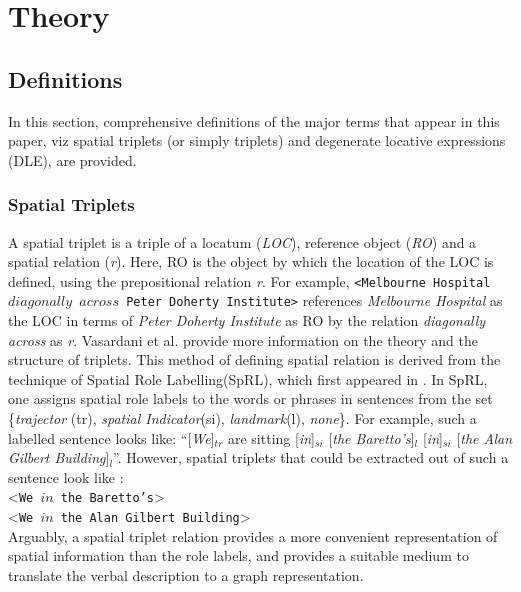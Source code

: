 \documentclass{acm_proc_article-sp}
\begin{document}
\section{Theory}
\subsection{Definitions}
In this section, comprehensive definitions of the major terms that appear in this paper, viz spatial triplets (or simply triplets) and degenerate locative expressions (DLE), are provided.
\subsubsection{Spatial Triplets}
A spatial triplet is a triple of a locatum (\textit{LOC}), reference object (\textit{RO}) and a spatial relation (\textit{r}). Here, RO is the object by which the location of the LOC is defined, using the prepositional relation \textit{r}. For example, \texttt{<Melbourne Hospital $diagonally$ $across$ Peter Doherty Institute>} references \textit{Melbourne Hospital} as the LOC in terms of \textit{Peter Doherty Institute} as RO by the relation \textit{diagonally across} as \textit{r}. Vasardani et al. \cite{maria:descriptions} provide more information on the theory and the structure of triplets. This method of defining spatial relation is derived from the technique of Spatial Role Labelling(SpRL), which first appeared in \cite{Kordjamshidi:labelling}. In SpRL, one assigns spatial role labels to the words or phrases in sentences from the set \{\textit{trajector} (tr), \textit{spatial Indicator}(si), \textit{landmark}(l), \textit{none}\}. For example, such a labelled sentence looks like:
``[\textit{We}]$_{tr}$ are sitting [\textit{in}]$_{si}$ [\textit{the Baretto's}]$_l$ [\textit{in}]$_{si}$ [\textit{the Alan Gilbert Building}]$_{l}$''. However, spatial triplets that could be extracted out of such a sentence look like : \\<\texttt{We ${in}$ the Baretto's}> \\<\texttt{We ${in}$ the Alan Gilbert Building}>\\
Arguably, a spatial triplet relation provides a more convenient representation of spatial information than the role labels, and provides a suitable medium to translate the verbal description to a graph representation.
\end{document}
